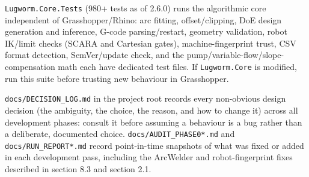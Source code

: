 \documentclass[11pt]{article}
\newcommand{\param}[1]{\texttt{#1}}
\begin{document}
\param{Lugworm.Core.Tests} (980+ tests as of 2.6.0) runs the
algorithmic core independent of Grasshopper/Rhino: arc fitting,
offset/clipping, DoE design generation and inference, G-code
parsing/restart, geometry validation, robot
IK/limit checks (SCARA and Cartesian gates), machine-fingerprint
trust, CSV format detection, SemVer/update check, and the
pump/variable-flow/slope-compensation math each have dedicated test
files. If \param{Lugworm.Core} is modified, run this suite before
trusting new behaviour in Grasshopper.

\param{docs/DECISION\_LOG.md} in the project root records every
non-obvious design decision (the ambiguity, the choice, the reason, and
how to change it) across all development phases: consult it before
assuming a behaviour is a bug rather than a deliberate, documented
choice. \param{docs/AUDIT\_PHASE0*.md} and \param{docs/RUN\_REPORT*.md}
record point-in-time snapshots of what was fixed or added in each
development pass, including the ArcWelder and robot-fingerprint fixes
described in section 8.3 and section 2.1.
\end{document}
